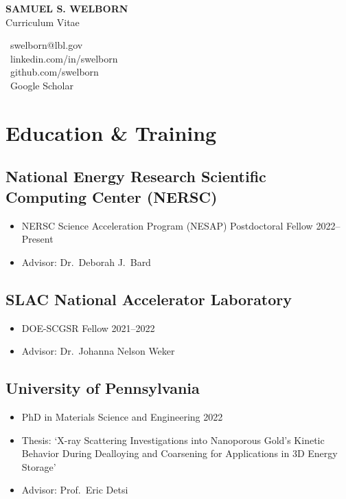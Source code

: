 \documentclass[11pt]{article} %
\begin{document}
\begin{center}
  \begin{minipage}{0.5\textwidth}
    {\LARGE\bfseries
      SAMUEL S. WELBORN
    } \\ \medskip
    Curriculum Vitae
  \end{minipage} \hfill
  \begin{minipage}{0.4\textwidth}
    \raggedleft
    {\faEnvelope} \ {swelborn@lbl.gov} \\
    \href{https://www.linkedin.com/in/swelborn}{\faLinkedin} \ linkedin.com/in/swelborn \\
    \href{https://github.com/swelborn}{\faGithub} \ github.com/swelborn \\
    \href{https://scholar.google.com/citations?user=WsQfglgAAAAJ&hl=en&authuser=1}{\faGraduationCap} \ Google Scholar
  \end{minipage}
\end{center}

\section{Education \& Training}
\subsection{National Energy Research Scientific Computing Center (NERSC)}
\begin{itemize}
  \item NERSC Science Acceleration Program (NESAP) Postdoctoral Fellow \hfill 2022--Present
  \item Advisor: Dr.\ Deborah J.\ Bard
\end{itemize}

\subsection{SLAC National Accelerator Laboratory}
\begin{itemize}
  \item DOE-SCGSR Fellow \hfill 2021--2022
  \item Advisor: Dr.\ Johanna Nelson Weker
\end{itemize}

\subsection{University of Pennsylvania}
\begin{itemize}
  \item PhD in Materials Science and Engineering \hfill 2022
  \item Thesis: `X-ray Scattering Investigations into Nanoporous Gold's Kinetic Behavior During Dealloying and Coarsening for Applications in 3D Energy Storage'
  \item Advisor: Prof.\ Eric Detsi
\end{itemize}
\end{document}
